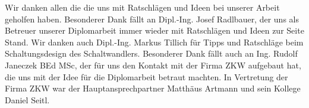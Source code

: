 \begin{acknowledgements}
	\begin{center}
    Wir danken allen die die uns mit Ratschlägen und Ideen bei unserer Arbeit geholfen haben. Besonderer Dank fällt an Dipl.-Ing. Josef Radlbauer, der uns als Betreuer unserer Diplomarbeit immer wieder mit Ratschlägen und Ideen zur Seite Stand. Wir danken auch Dipl.-Ing. Markus Tillich für Tipps und Ratschläge beim Schaltungsdesign des Schaltwandlers. Besonderer Dank fällt auch an Ing. Rudolf Janeczek BEd MSc, der für uns den Kontakt mit der Firma ZKW aufgebaut hat, die uns mit der Idee für die Diplomarbeit betraut machten. In Vertretung der Firma ZKW war der Hauptansprechpartner Matthäus Artmann und sein Kollege Daniel Seitl. 
	\end{center}
\end{acknowledgements}
